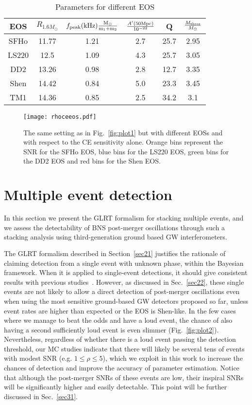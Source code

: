 \documentclass[prd,aps,floatfix,superscriptaddress,nofootinbib,twocolumn,10pt,English]{revtex4-1}
\begin{document}
 
\begin{table}[ht]
\caption{Parameters for different EOS}
\centering
\begin{tabular}{c c c c c c}
\hline\hline
EOS & $R_{1.6 M_\odot}$ & $f_{\rm peak} (\rm kHz) \frac{M_\odot}{m_1+m_2}$ & $\frac{A' (50 {\rm Mpc})}{10^{-22}}$ & Q & $\frac{M_{\rm thres}}{M_\odot}$ \\
\hline
SFHo & 11.77 &1.21 & 2.7 & 25.7 & 2.95 \\
LS220 & 12.5 & 1.09 & 4.3 & 25.7 & 3.05 \\
DD2 & 13.26 & 0.98 &  2.8 & 12.7 & 3.35 \\
Shen & 14.42 & 0.84 & 5.0 & 23.3 & 3.45 \\
TM1 & 14.36 & 0.85 & 2.5 & 34.2 & 3.1 \\
\hline
\end{tabular}
\label{table:para}
\end{table}

\begin{figure}[tb]
\texttt{[image: rhoceeos.pdf]}
\caption{The same setting as in Fig.~\ref{fig:plot1} but with different EOSs
  and with respect to the CE sensitivity alone.  Orange bins represent
  the SNR for the SFHo EOS, blue bins for the
  LS220 EOS, green bins for the DD2 EOS and red
  bins for the Shen EOS. }
\label{fig:plot3}
\end{figure}



\section{Multiple event detection}\label{sec3}

In this section we present the GLRT formalism for stacking multiple
events, and we assess the detectability of BNS post-merger oscillations
through such a stacking analysis using third-generation ground based
GW interferometers.


The GLRT formalism described in Section~\ref{sec21} justifies the
rationale of claiming detection from a single event with unknown
phase, within the Bayesian framework. When it is applied to
single-event detections, it should give consistent results with
previous studies~\cite{clark2016observing}.  However, as discussed in
Sec.~\ref{sec22}, these single events are not likely to allow a direct
detection of post-merger oscillations even when using the most
sensitive ground-based GW detectors proposed so far, unless event
rates are higher than expected or the EOS is Shen-like.
In the few cases where we manage to beat
the odds and have a loud event, the chance of also having a second
sufficiently loud event is even slimmer (Fig.~\ref{fig:plot2}).
Nevertheless, regardless of whether there is a loud event passing the
detection threshold, our MC studies indicate that there will likely be
several tens of events with modest SNR (e.g. $1\le \rho \le 5$), which
we exploit in this work to increase the chances of detection and
improve the accuracy of parameter estimation. Notice that although the
post-merger SNRs of these events are low, their inspiral SNRs will
be significantly higher and easily detectable.
This point will be further discussed in Sec.~\ref{sec31}.
\end{document}
